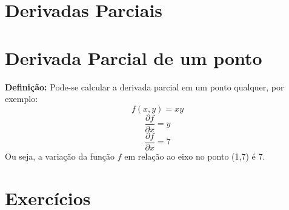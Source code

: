 \documentclass{book}
\numberwithin{defn}{chapter}
\numberwithin{exe}{chapter}
\numberwithin{ex}{chapter}
\numberwithin{obs}{chapter}
\numberwithin{fato}{chapter}
\numberwithin{resp}{chapter}
\begin{document}
\section{Derivadas Parciais} %
\section{Derivada Parcial de um ponto} 
\textbf{Definição:} Pode-se calcular a derivada parcial em um ponto qualquer, por exemplo:
\[f(x, y) = xy\]
\[\frac{\partial f}{\partial x} = y\]
\[\frac{\partial f}{\partial x} = 7\]
Ou seja, a variação da função \(f\) em relação ao eixo no ponto (1,7) é 7.



\section{Exercícios}
\end{document}
